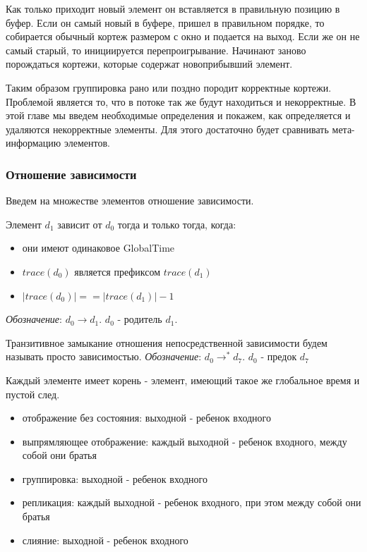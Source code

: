 \documentclass[14pt]{matmex-diploma-custom}
\begin{document}
Как только приходит новый элемент он вставляется в правильную позицию в буфер. Если он самый новый в буфере, пришел в правильном порядке, то собирается обычный кортеж размером с окно и подается на выход. Если же он не самый старый, то инициируется перепроигрывание. Начинают заново порождаться кортежи, которые содержат новоприбывший элемент.

Таким образом группировка рано или поздно породит корректные кортежи. Проблемой является то, что в потоке так же будут находиться и некорректные. В этой главе мы введем необходимые определения и покажем, как определяется и удаляются некорректные элементы. Для этого достаточно будет сравнивать мета-информацию элементов.

\subsubsection{Отношение зависимости}

Введем на множестве элементов отношение зависимости.

Элемент \(d_1\) зависит от \(d_0\) тогда и только тогда, когда:

\begin{itemize}
  \item они имеют одинаковое GlobalTime
  \item \(trace(d_0)\) является префиксом \(trace(d_1)\)
  \item \(|trace(d_0)| == |trace(d_1)| - 1\)
\end{itemize}

\textit{Обозначение}: \(d_0 \rightarrow d_1\). \(d_0\) - родитель \(d_1\).

Транзитивное замыкание отношения непосредственной зависимости будем называть просто зависимостью. \textit{Обозначение}: \(d_0 \rightarrow^* d_7\). \(d_0\) - предок \(d_7\)

Каждый элементе имеет корень - элемент, имеющий такое же глобальное время и пустой след.

\begin{itemize}
  \item отображение без состояния: выходной - ребенок входного
  \item выпрямляющее отображение: каждый выходной - ребенок входного, между собой они братья
  \item группировка: выходной - ребенок входного
  \item репликация: каждый выходной - ребенок входного, при этом между собой они братья
  \item слияние: выходной - ребенок входного
\end{itemize}
\end{document}
